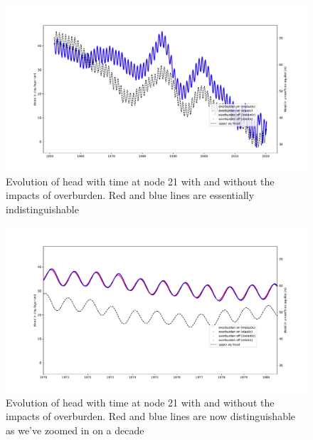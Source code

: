 \documentclass{article}
\begin{document}
\begin{figure}
\includegraphics[width=\linewidth]{BasicIllustration.pdf}
\caption{Evolution of head with time at node 21 with and without the impacts of overburden. Red and blue lines are essentially indistinguishable}
\label{fig:overburden1}
\end{figure}

\begin{figure}
\includegraphics[width=\linewidth]{BasicIllustration_ZOOM.pdf}
\caption{Evolution of head with time at node 21 with and without the impacts of overburden. Red and blue lines are now distinguishable as we've zoomed in on a decade}
\label{fig:overburden2}
\end{figure}
\end{document}
